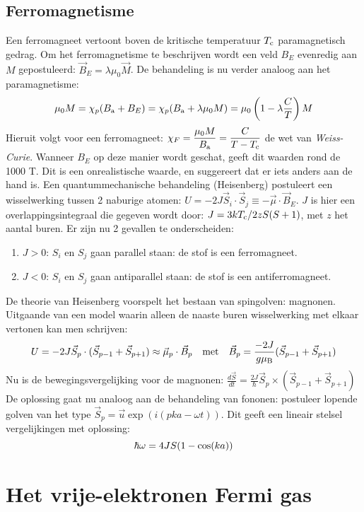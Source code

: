 \subsection{Ferromagnetisme}
Een ferromagneet vertoont boven de kritische temperatuur $T_{\rm c}$
paramagnetisch gedrag. Om het ferromagnetisme te beschrijven wordt een veld
$B_E$ evenredig aan $M$ gepostuleerd: $\vec{B}_E=\lambda\mu_0\vec{M}$.
De behandeling is nu verder analoog aan het paramagnetisme:
\[
\mu_0 M=\chi_p(B_{\rm a}+B_E)=\chi_p(B_{\rm a}+\lambda\mu_0 M)=
\mu_0\left(1-\lambda\frac{C}{T}\right)M
\]
Hieruit volgt voor een ferromagneet:
$\displaystyle\chi_F=\frac{\mu_0 M}{B_{\rm a}}=\frac{C}{T-T_{\rm c}}$
de wet van {\it Weiss-Curie}.
\npar
Wanneer $B_E$ op deze manier wordt geschat, geeft dit waarden rond de 1000 T.
Dit is een onrealistische waarde, en suggereert dat er iets anders aan de
hand is. Een quantummechanische behandeling (Heisenberg) postuleert een
wisselwerking tussen 2 naburige atomen:
$U=-2J\vec{S}_i\cdot\vec{S}_j\equiv-\vec{\mu}\cdot\vec{B}_E$. $J$ is hier een
overlappingsintegraal die gegeven wordt door: $J=3kT_{\rm c}/2zS(S+1)$,
met $z$ het aantal buren. Er zijn nu 2 gevallen te onderscheiden:
\begin{enumerate}
\item $J>0$: $S_i$ en $S_j$ gaan parallel staan: de stof is een ferromagneet.
\item $J<0$: $S_i$ en $S_j$ gaan antiparallel staan: de stof is een
      antiferromagneet.
\end{enumerate}
De theorie van Heisenberg voorspelt het bestaan van spingolven: magnonen.
Uitgaande van een model waarin alleen de naaste buren wisselwerking met
elkaar vertonen kan men schrijven:
\[
U=-2J\vec{S}_p\cdot(\vec{S}_{p-1}+\vec{S}_{p+1})\approx
\vec{\mu}_p\cdot\vec{B}_p~~~\mbox{met}~~~
\vec{B}_p=\frac{-2J}{g\mu_{\rm B}}(\vec{S}_{p-1}+\vec{S}_{p+1})
\]
Nu is de bewegingsvergelijking voor de magnonen:
$\displaystyle\frac{d\vec{S}}{dt}=\frac{2J}{\hbar}\vec{S}_p\times(\vec{S}_{p-1}+\vec{S}_{p+1})$
\npar
De oplossing gaat nu analoog aan de behandeling van fononen: postuleer
lopende golven van het type $\vec{S}_p=\vec{u}\exp(i(pka-\omega t))$.
Dit geeft een lineair stelsel vergelijkingen met oplossing:
\[
\hbar\omega=4JS(1-\cos(ka))
\]

\section{Het vrije-elektronen Fermi gas}
